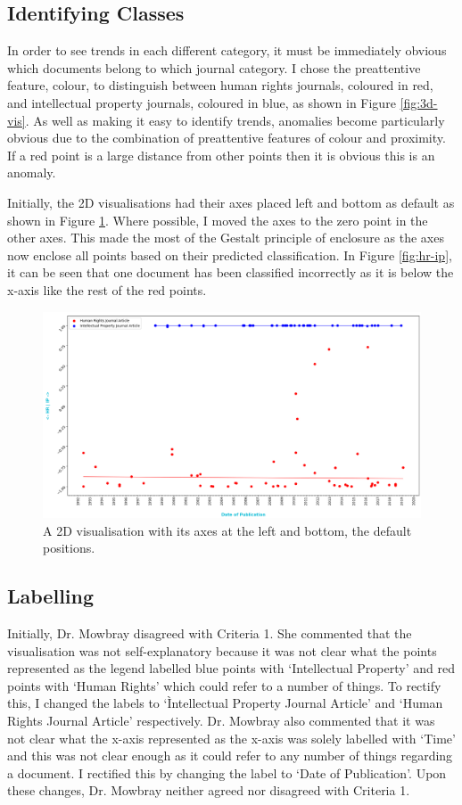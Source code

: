 		\subsection{Identifying Classes}\label{fig:gtpc}
			In order to see trends in each different category, it must be immediately obvious which documents belong to which journal category. I chose the preattentive feature, colour, to distinguish between human rights journals, coloured in red, and intellectual property journals, coloured in blue, as shown in Figure \ref{fig:3d-vis}. As well as making it easy to identify trends, anomalies become particularly obvious due to the combination of preattentive features of colour and proximity. If a red point is a large distance from other points then it is obvious this is an anomaly.
			
			Initially, the 2D visualisations had their axes placed left and bottom as default as shown in Figure \ref{fig:2d-axes-out}. Where possible, I moved the axes to the zero point in the other axes. This made the most of the Gestalt principle of enclosure as the axes now enclose all points based on their predicted classification. In Figure \ref{fig:hr-ip}, it can be seen that one document has been classified incorrectly as it is below the x-axis like the rest of the red points.
			\begin{figure}
    			\centering
    			\includegraphics[width=0.9\linewidth]{resources/images/2d_axes_out.png}
    			\caption{A 2D visualisation with its axes at the left and bottom, the default positions.}
    			\label{fig:2d-axes-out}
			\end{figure}
			
		\subsection{Labelling}\label{sec:lab}
			Initially, Dr. Mowbray disagreed with Criteria 1. She commented that the visualisation was not self-explanatory because it was not clear what the points represented as the legend labelled blue points with `Intellectual Property' and red points with `Human Rights' which could refer to a number of things. To rectify this, I changed the labels to `Ìntellectual Property Journal Article' and `Human Rights Journal Article' respectively. Dr. Mowbray also commented that it was not clear what the x-axis represented as the x-axis was solely labelled with `Time' and this was not clear enough as it could refer to any number of things regarding a document. I rectified this by changing the label to `Date of Publication'. Upon these changes, Dr. Mowbray neither agreed nor disagreed with Criteria 1.
			
